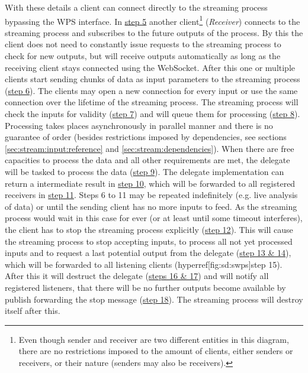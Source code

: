 	With these details a client can connect directly to the streaming process bypassing the \ac{WPS} interface. In \hyperref[fig:sd:swps]{step 5} another client\footnote{Even though sender and receiver are two different entities in this diagram, there are no restrictions imposed to the amount of clients, either senders or receivers, or their nature (senders may also be receivers).} (\emph{Receiver}) connects to the streaming process and subscribes to the future outputs of the process. By this the client does not need to constantly issue requests to the streaming process to check for new outputs, but will receive outputs automatically as long as the receiving client stays connected using the WebSocket.
	After this one or multiple clients start sending chunks of data as input parameters to the streaming process (\hyperref[fig:sd:swps]{step 6}). The clients may open a new connection for every input or use the same connection over the lifetime of the streaming process. The streaming process will check the inputs for validity (\hyperref[fig:sd:swps]{step 7}) and will queue them for processing (\hyperref[fig:sd:swps]{step 8}).
	Processing takes places asynchronously in parallel manner and there is no guarantee of order (besides restrictions imposed by dependencies, see sections \ref{sec:stream:input:reference} and \ref{sec:stream:dependencies}). When there are free capacities to process the data and all other requirements are met, the delegate will be tasked to process the data (\hyperref[fig:sd:swps]{step 9}). The delegate implementation can return a intermediate result in \hyperref[fig:sd:swps]{step 10}, which will be forwarded to all registered receivers in \hyperref[fig:sd:swps]{step 11}.
	Steps 6 to 11 may be repeated indefinitely (e.g. live analysis of data) or until the sending client has no more inputs to feed. As the streaming process would wait in this case for ever (or at least until some timeout interferes), the client has to stop the streaming process explicitly (\hyperref[fig:sd:swps]{step 12}).
	This will cause the streaming process to stop accepting inputs, to process all not yet processed inputs and to request a last potential output from the delegate (\hyperref[fig:sd:swps]{step 13 \& 14}), which will be forwarded to all listening clients (hyperref[fig:sd:swps]{step 15}). After this it will destruct the delegate (\hyperref[fig:sd:swps]{steps 16 \& 17}) and will notify all registered listeners, that there will be no further outputs become available by publish forwarding the stop message (\hyperref[fig:sd:swps]{step 18}). The streaming process will destroy itself after this.

